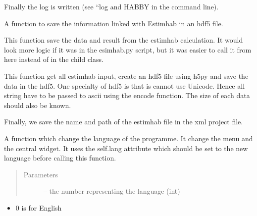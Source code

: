 \documentclass[letterpaper,10pt,english]{sphinxmanual}
\begin{document}
\begin{fulllineitems}
\begin{fulllineitems}
Finally the log is written (see “log and HABBY in the command line).

\end{fulllineitems}


\begin{fulllineitems}
\label{\detokenize{index:src_GUI.Main_windows_1.MainWindows.save_project_estimhab}}
A function to save the information linked with Estimhab in an hdf5 file.


This function save the data and result from the estimhab calculation. It would look more logic if it was in
the esimhab.py script, but it was easier to call it from here instead of in the child class.

This function get all estimhab input, create an hdf5 file using h5py and save the data in the hdf5. One
specialty of hdf5 is that is cannot use Unicode. Hence all string have to be passed to ascii using the encode
function. The size of each data should also be known.

Finally, we save the name and path of the estimhab file in the xml project file.

\end{fulllineitems}


\begin{fulllineitems}
\label{\detokenize{index:src_GUI.Main_windows_1.MainWindows.setlangue}}
A function which change the language of the programme. It change the menu and the central widget.
It uses the self.lang attribute which should be set to the new language before calling this function.
\begin{quote}\begin{description}
\item[{Parameters}] \leavevmode
{} -- the number representing the language (int)

\end{description}\end{quote}
\begin{itemize}
\item {} 
0 is for English


\end{itemize}
\end{fulllineitems}
\end{fulllineitems}
\end{document}
